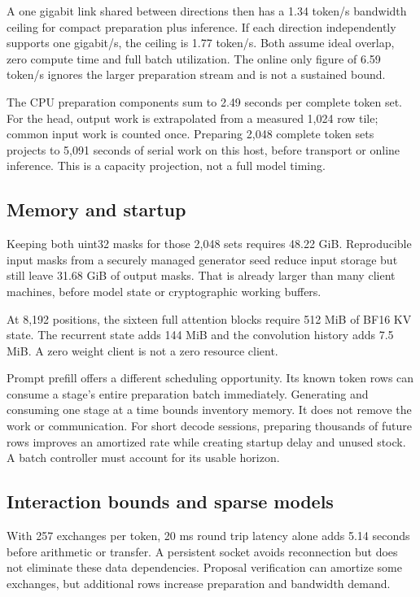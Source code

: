\documentclass[10pt,twocolumn]{article}
\begin{document}
A one gigabit link shared between directions then has a 1.34 token/s bandwidth
ceiling for compact preparation plus inference. If each direction independently
supports one gigabit/s, the ceiling is 1.77 token/s. Both assume ideal overlap,
zero compute time and full batch utilization. The online only figure of 6.59
token/s ignores the larger preparation stream and is not a sustained bound.

The CPU preparation components sum to 2.49 seconds per complete token set.
For the head, output work is extrapolated from a measured 1,024 row tile;
common input work is counted once. Preparing 2,048 complete token sets projects
to 5,091 seconds of serial work on this host, before transport or online
inference. This is a capacity projection, not a full model timing.

\subsection{Memory and startup}
Keeping both uint32 masks for those 2,048 sets requires 48.22 GiB. Reproducible
input masks from a securely managed generator seed reduce input storage but
still leave 31.68 GiB of output masks. That is already larger than many client
machines, before model state or cryptographic working buffers.

At 8,192 positions, the sixteen full attention blocks require 512 MiB of BF16
KV state. The recurrent state adds 144 MiB and the convolution history adds
7.5 MiB. A zero weight client is not a zero resource client.

Prompt prefill offers a different scheduling opportunity. Its known token
rows can consume a stage's entire preparation batch immediately. Generating and
consuming one stage at a time bounds inventory memory. It does not remove the
work or communication. For short decode sessions, preparing thousands of future
rows improves an amortized rate while creating startup delay and unused stock.
A batch controller must account for its usable horizon.

\subsection{Interaction bounds and sparse models}
With 257 exchanges per token, 20 ms round trip latency alone adds 5.14 seconds
before arithmetic or transfer. A persistent socket avoids reconnection but does
not eliminate these data dependencies. Proposal verification can amortize some
exchanges, but additional rows increase preparation and bandwidth demand.
\end{document}
